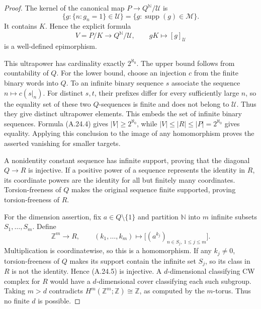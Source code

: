 \begin{proof}
The kernel of the canonical map
$P\to Q^{\mathbb N}/\mathcal U$ is
\[
 \{g:\{n:g_n=1\}\in\mathcal U\}
   =\{g:\operatorname{supp}(g)\in\mathcal M\}.
\]
It contains $K$. Hence the explicit formula
\[
 V=P/K\longrightarrow Q^{\mathbb N}/\mathcal U,
       \qquad gK\longmapsto[g]_{\mathcal U}
 \tag{A.24.4}
\]
is a well-defined epimorphism.

This ultrapower has cardinality exactly $2^{\aleph_0}$. The
upper bound follows from countability of $Q$. For the lower
bound, choose an injection $c$ from the finite binary words
into $Q$. To an infinite binary sequence $s$ associate the
sequence $n\mapsto c(s|_n)$. For distinct $s,t$, their prefixes
differ for every sufficiently large $n$, so the equality set
of these two $Q$-sequences is finite and does not belong to
$\mathcal U$. Thus they give distinct ultrapower elements.
This embeds the set of infinite binary sequences. Formula
(A.24.4) gives $|V|\geq2^{\aleph_0}$, while
$|V|\leq|R|\leq|P|=2^{\aleph_0}$ gives equality. Applying
this conclusion to the image of any homomorphism proves
the asserted vanishing for smaller targets.

A nonidentity constant sequence has infinite support, proving
that the diagonal $Q\to R$ is injective. If a positive power
of a sequence represents the identity in $R$, its coordinate
powers are the identity for all but finitely many coordinates.
Torsion-freeness of $Q$ makes the original sequence finite
supported, proving torsion-freeness of $R$.

For the dimension assertion, fix $a\in Q\setminus\{1\}$
and partition $\mathbb N$ into $m$ infinite subsets
$S_1,\ldots,S_m$. Define
\[
 \mathbb Z^m\longrightarrow R,
 \qquad (k_1,\ldots,k_m)\longmapsto
 \bigl[(a^{k_j})_{n\in S_j,\ 1\leq j\leq m}\bigr].
 \tag{A.24.5}
\]
Multiplication is coordinatewise, so this is a homomorphism.
If any $k_j\ne0$, torsion-freeness of $Q$ makes its support
contain the infinite set $S_j$, so its class in $R$ is not
the identity. Hence (A.24.5) is injective. A $d$-dimensional
classifying CW complex for $R$ would have a $d$-dimensional
cover classifying each such subgroup. Taking $m>d$ contradicts
$H^m(\mathbb Z^m;\mathbb Z)\cong\mathbb Z$, as computed
by the $m$-torus. Thus no finite $d$ is possible.
\end{proof}

